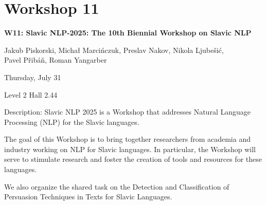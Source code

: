 \clearpage



\section[W11: Slavic NLP-2025: The 10th Biennial Workshop \\
on Slavic NLP]{Workshop 11}
\label{workshop_11}

\begin{center}
    {\Large \textbf{W11: Slavic NLP-2025: The 10th Biennial Workshop on Slavic NLP}}\\
    
 \vspace{5mm}

   Jakub Piskorski, Michał Marcińczuk, Preslav Nakov, Nikola Ljubešić, \\
   Pavel Přibáň, Roman Yangarber\\

 \vspace{5mm}

    Thursday, July 31
    
   Level 2 Hall 2.44

\end{center}

Description: Slavic NLP 2025 is a Workshop that addresses Natural Language Processing (NLP) for the Slavic languages.

The goal of this Workshop is to bring together researchers from academia and industry working on NLP for Slavic languages. In particular, the Workshop will serve to stimulate research and foster the creation of tools and resources for these languages.

We also organize the shared task on the Detection and Classification of Persuasion Techniques in Texts for Slavic Languages.

